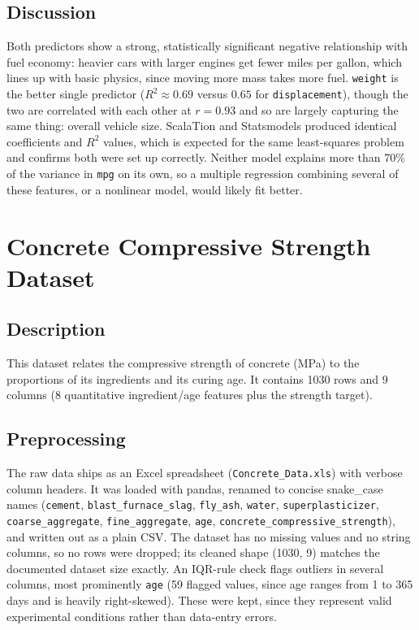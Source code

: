\documentclass[11pt]{article}
\begin{document}
\subsection{Discussion}
Both predictors show a strong, statistically significant negative
relationship with fuel economy: heavier cars with larger engines get fewer
miles per gallon, which lines up with basic physics, since moving more mass
takes more fuel. \texttt{weight} is the better single predictor
($R^2 \approx 0.69$ versus $0.65$ for \texttt{displacement}), though the two
are correlated with each other at $r=0.93$ and so are largely capturing the
same thing: overall vehicle size. ScalaTion and Statsmodels produced
identical coefficients and $R^2$ values, which is expected for the same
least-squares problem and confirms both were set up correctly. Neither model
explains more than 70\% of the variance in \texttt{mpg} on its own, so a
multiple regression combining several of these features, or a nonlinear
model, would likely fit better.

\clearpage
\section{Concrete Compressive Strength Dataset}

\subsection{Description}
This dataset relates the compressive strength of concrete (MPa) to the
proportions of its ingredients and its curing age. It contains 1030 rows and
9 columns (8 quantitative ingredient/age features plus the strength target).

\subsection{Preprocessing}
\begin{sloppypar}
The raw data ships as an Excel spreadsheet (\texttt{Concrete\_Data.xls}) with
verbose column headers. It was loaded with pandas, renamed to concise
snake\_case names (\texttt{cement}, \texttt{blast\_furnace\_slag},
\texttt{fly\_ash}, \texttt{water}, \texttt{superplasticizer},
\texttt{coarse\_aggregate}, \texttt{fine\_aggregate}, \texttt{age},
\texttt{concrete\_compressive\_strength}), and written out as a plain CSV.
The dataset has no missing values and no string columns, so no rows were
dropped; its cleaned shape (1030, 9) matches the documented dataset size
exactly. An IQR-rule check flags outliers in several columns, most
prominently \texttt{age} (59 flagged values, since age ranges from 1 to 365
days and is heavily right-skewed). These were kept, since they represent
valid experimental conditions rather than data-entry errors.
\end{sloppypar}
\end{document}
